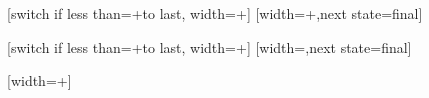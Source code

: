 %

{
  [switch if less than=+\pgfdecorationsegmentlength to last,
                   width=+\pgfdecorationsegmentlength]
  {
    \pgfpathmoveto{\pgfqpoint{0pt}{\pgfdecorationsegmentamplitude}}
    \pgfpathlineto{\pgfqpoint{\pgfdecorationsegmentobjectlength}{0pt}}
    \pgfpathlineto{\pgfqpoint{0pt}{-\pgfdecorationsegmentamplitude}}
    \pgfpathclose
  }
  [width=+\pgfdecorationsegmentobjectlength,next state=final]
  {
    \pgfpathmoveto{\pgfqpoint{0pt}{\pgfdecorationsegmentamplitude}}
    \pgfpathlineto{\pgfqpoint{\pgfdecorationsegmentobjectlength}{0pt}}
    \pgfpathlineto{\pgfqpoint{0pt}{-\pgfdecorationsegmentamplitude}}
    \pgfpathclose
  }
  {
    \pgfpathmoveto{\pgfpointdecoratedpathlast}
  }
}



%

{
  [switch if less than=+\pgfdecorationsegmentlength to last,
                   width=+\pgfdecorationsegmentlength]
  {
    \pgfpathmoveto{\pgfqpoint{0pt}{\pgfdecorationsegmentamplitude}}
    \pgfpathlineto{\pgfqpoint{\pgfdecorationsegmentobjectlength}{-\pgfdecorationsegmentamplitude}}
    \pgfpathmoveto{\pgfqpoint{0pt}{-\pgfdecorationsegmentamplitude}}
    \pgfpathlineto{\pgfqpoint{\pgfdecorationsegmentobjectlength}{\pgfdecorationsegmentamplitude}}
  }
  [width=\pgfdecorationsegmentobjectlength,next state=final]
  {
    \pgfpathmoveto{\pgfqpoint{0pt}{\pgfdecorationsegmentamplitude}}
    \pgfpathlineto{\pgfqpoint{\pgfdecorationsegmentobjectlength}{-1\pgfdecorationsegmentamplitude}}
    \pgfpathmoveto{\pgfqpoint{0pt}{-\pgfdecorationsegmentamplitude}}
    \pgfpathlineto{\pgfqpoint{\pgfdecorationsegmentobjectlength}{\pgfdecorationsegmentamplitude}}
  }
  {
    \pgfpathmoveto{\pgfpointdecoratedpathlast}
  }
}




%

{
  [width=+\pgfdecorationsegmentlength]
  {
    \pgfpathmoveto{\pgfqpoint{0pt}{\pgfdecorationsegmentamplitude}}
    \pgfpathlineto{\pgfqpoint{0pt}{-\pgfdecorationsegmentamplitude}}
  }
  {
    \pgfpathmoveto{\pgfqpoint{0pt}{\pgfdecorationsegmentamplitude}}
    \pgfpathlineto{\pgfqpoint{0pt}{-\pgfdecorationsegmentamplitude}}
    \pgfpathmoveto{\pgfpointdecoratedpathlast}
  }
}



